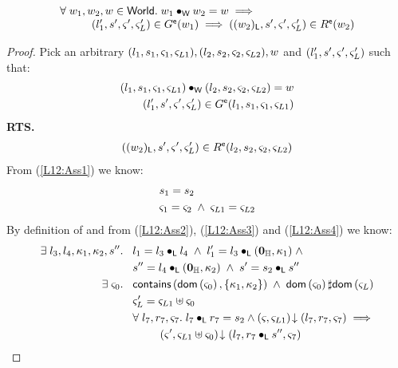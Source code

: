 \begin{lemma}[]\label{lem:extendGContainment}
%
\[
\begin{array}{l}
	\forall\; w_1, w_2, w \in \textsf{World}.\; w_1 \bullet_{\textsf{W}} w_2 = w \implies\\
	\hspace*{1cm}(l'_1, s', \varsigma_{}', \varsigma_{L}') \in G^{\textsf{e}}(w_1) \implies ((w_2)_{\textsf{L}}, s', \varsigma_{}', \varsigma_{L}') \in R^{\textsf{e}}(w_2)
\end{array}
\]
%
\begin{proof} Pick an arbitrary $(l_1, s_1, \varsigma_{1}, \varsigma_{L1}), (l_2, s_2, \varsigma_{2}, \varsigma_{L2}), w$ and $(l'_1, s', \varsigma_{}', \varsigma_{L}')$ such that:
%
\begin{align}
	(l_1, s_1, \varsigma_{1}, \varsigma_{L1}) \bullet_{\textsf{W}} (l_2, s_2, \varsigma_{2}, \varsigma_{L2}) = w \label{L12:Ass1}\\
	(l'_1, s', \varsigma_{}', \varsigma_{L}') \in G^{\textsf{e}}(l_1, s_1, \varsigma_{1}, \varsigma_{L1}) \label{L12:Ass2}
\end{align}
%
\textbf{RTS.}
%
\begin{align}
	((w_2)_{\textsf{L}}, s', \varsigma_{}', \varsigma_{L}') \in R^{\textsf{e}}(l_2, s_2, \varsigma_{2}, \varsigma_{L2}) \label{L12:Goal}
\end{align}
From (\ref{L12:Ass1}) we know:
%
\begin{align}
	& s_1 = s_2 \label{L12:Ass3}\\
	& \varsigma_{1} = \varsigma_{2} \;\land\; \varsigma_{L1} = \varsigma_{L2} \label{L12:Ass4}
\end{align}
%
By definition of \extendG and from (\ref{L12:Ass2}), (\ref{L12:Ass3}) and (\ref{L12:Ass4}) we know:
%
\begin{align}
	\exsts{l_3, l_4, \ca{1}, \ca{2}, s''} \hspace*{0.2cm}& l_1 = l_3 \composeL l_4 \;\land\; l'_1 = l_3 \composeL (\unitH, \ca{1}) \;\land \label{L12:Ass5}\\
	& s'' = l_4 \composeL (\unitH, \ca{2}) \;\land\; s' = s_2 \composeL s'' \label{L12:Ass6}\\
%
	\exsts{\amod{0}} \hspace*{0.2cm} & \contains{\dom{\amod{0}}}{\{\ca{1}, \ca{2}\}} \;\land\;  \dom{\amod{0}} \disjoint \dom{\amod{L}} \label{L12:Ass7}\\
%
	& \amod{L}' = \amod{L1} \uplus \amod{0} \label{L12:fence}\\
%	
	&\for{l_7, r_7, \amod{7}} l_7 \composeL r_7 = s_2 \land \extendsAM{\amod{}, \amod{L1}}{l_7}{r_7}{\amod{7}} \implies \nonumber\\ 
	&\hspace*{0.8cm}\extendsAM{\amod{}', \amod{L1} \uplus \amod{0}}{l_7}{r_7 \composeL s''}{\amod{7}}  \label{L12:Ass9}\\

\end{align}
\end{proof}
\end{lemma}
